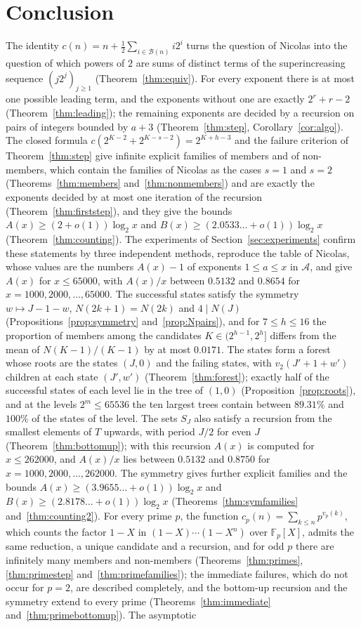 \documentclass[11pt]{amsart}
\theoremstyle{definition}
\begin{document}
\section{Conclusion}
\label{sec:conclusion}
The identity $c(n)=n+\frac12\sum_{i\in\mathcal{B}(n)}i2^i$ turns the question of Nicolas into the question of which powers of $2$ are sums of distinct terms of the superincreasing sequence $(j2^j)_{j\ge1}$ (Theorem~\ref{thm:equiv}). For every exponent there is at most one possible leading term, and the exponents without one are exactly $2^r+r-2$ (Theorem~\ref{thm:leading}); the remaining exponents are decided by a recursion on pairs of integers bounded by $a+3$ (Theorem~\ref{thm:step}, Corollary~\ref{cor:algo}). The closed formula $c(2^{K-2}+2^{K-s-2})=2^{K+h-3}$ and the failure criterion of Theorem~\ref{thm:step} give infinite explicit families of members and of non-members, which contain the families of Nicolas as the cases $s=1$ and $s=2$ (Theorems~\ref{thm:members} and~\ref{thm:nonmembers}) and are exactly the exponents decided by at most one iteration of the recursion (Theorem~\ref{thm:firststep}), and they give the bounds $A(x)\ge(2+o(1))\log_2x$ and $B(x)\ge(2.0533\ldots+o(1))\log_2x$ (Theorem~\ref{thm:counting}). The experiments of Section~\ref{sec:experiments} confirm these statements by three independent methods, reproduce the table of Nicolas, whose values are the numbers $A(x)-1$ of exponents $1\le a\le x$ in $\mathcal{A}$, and give $A(x)$ for $x\le65000$, with $A(x)/x$ between $0.5132$ and $0.8654$ for $x=1000,2000,\dots,65000$. The successful states satisfy the symmetry $w\mapsto J-1-w$, $N(2k+1)=N(2k)$ and $4\mid N(J)$ (Propositions~\ref{prop:symmetry} and~\ref{prop:Npairs}), and for $7\le h\le16$ the proportion of members among the candidates $K\in(2^{h-1},2^h]$ differs from the mean of $N(K-1)/(K-1)$ by at most $0.0171$. The states form a forest whose roots are the states $(J,0)$ and the failing states, with $v_2(J'+1+w')$ children at each state $(J',w')$ (Theorem~\ref{thm:forest}); exactly half of the successful states of each level lie in the tree of $(1,0)$ (Proposition~\ref{prop:roots}), and at the levels $2^m\le65536$ the ten largest trees contain between $89.31\%$ and $100\%$ of the states of the level. The sets $S_J$ also satisfy a recursion from the smallest elements of $T$ upwards, with period $J/2$ for even $J$ (Theorem~\ref{thm:bottomup}); with this recursion $A(x)$ is computed for $x\le262000$, and $A(x)/x$ lies between $0.5132$ and $0.8750$ for $x=1000,2000,\dots,262000$. The symmetry gives further explicit families and the bounds $A(x)\ge(3.9655\ldots+o(1))\log_2x$ and $B(x)\ge(2.8178\ldots+o(1))\log_2x$ (Theorems~\ref{thm:symfamilies} and~\ref{thm:counting2}). For every prime $p$, the function $c_p(n)=\sum_{k\le n}p^{v_p(k)}$, which counts the factor $1-X$ in $(1-X)\cdots(1-X^n)$ over $\mathbb{F}_p[X]$, admits the same reduction, a unique candidate and a recursion, and for odd $p$ there are infinitely many members and non-members (Theorems~\ref{thm:primes}, \ref{thm:primestep} and~\ref{thm:primefamilies}); the immediate failures, which do not occur for $p=2$, are described completely, and the bottom-up recursion and the symmetry extend to every prime (Theorems~\ref{thm:immediate} and~\ref{thm:primebottomup}). The asymptotic 
\end{document}
